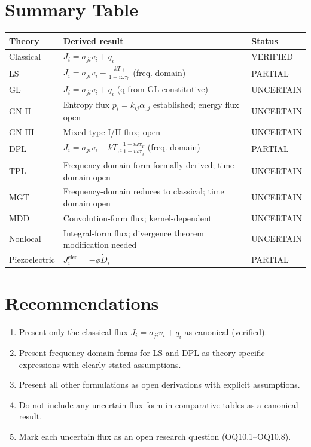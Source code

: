 \section{Summary Table}

\begin{table}[h]
\centering
\small
\begin{tabularx}{\textwidth}{@{}lXX@{}}
\toprule
\textbf{Theory} & \textbf{Derived result} & \textbf{Status} \\
\midrule
Classical & $J_i = \sigma_{ji}v_i + q_i$ & VERIFIED \\
LS & $J_i = \sigma_{ji}v_i - \frac{kT_{,i}}{1-i\omega\tau_0}$ (freq. domain) & PARTIAL \\
GL & $J_i = \sigma_{ji}v_i + q_i$ (q from GL constitutive) & UNCERTAIN \\
GN-II & Entropy flux $p_i = k_{ij}\alpha_{,j}$ established; energy flux open & UNCERTAIN \\
GN-III & Mixed type I/II flux; open & UNCERTAIN \\
DPL & $J_i = \sigma_{ji}v_i - kT_{,i}\frac{1-i\omega\tau_T}{1-i\omega\tau_q}$ (freq. domain) & PARTIAL \\
TPL & Frequency-domain form formally derived; time domain open & UNCERTAIN \\
MGT & Frequency-domain reduces to classical; time domain open & UNCERTAIN \\
MDD & Convolution-form flux; kernel-dependent & UNCERTAIN \\
Nonlocal & Integral-form flux; divergence theorem modification needed & UNCERTAIN \\
Piezoelectric & $J_i^{\text{elec}} = -\phi\dot{D}_i$ & PARTIAL \\
\bottomrule
\end{tabularx}
\end{table}

\section{Recommendations}

\begin{enumerate}
\item Present only the classical flux $J_i = \sigma_{ji}v_i + q_i$ as canonical (verified).
\item Present frequency-domain forms for LS and DPL as theory-specific expressions with clearly stated assumptions.
\item Present all other formulations as open derivations with explicit assumptions.
\item Do not include any uncertain flux form in comparative tables as a canonical result.
\item Mark each uncertain flux as an open research question (OQ10.1--OQ10.8).
\end{enumerate}

